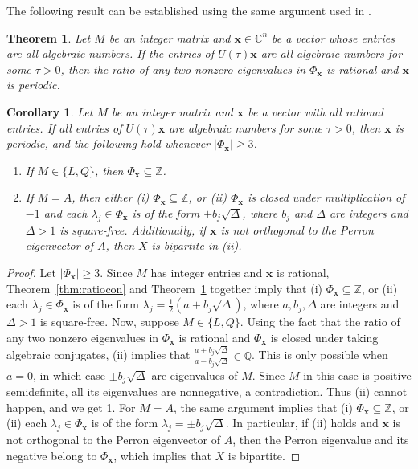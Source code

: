 \documentclass[11pt]{article}
\newtheorem{theorem}{Theorem}
\newtheorem{corollary}{Corollary}
\newcommand{\bx}{\mathbf x}
\newcommand{\supp}{{\Phi}}
\def\C{\mathbb{C}}
\def\Q{\mathbb{Q}}
\def\Z{\mathbb{Z}}
\begin{document}
The following result can be established using the same argument used in 
\cite[Theorem 3.4]{Godsil2013}.

\begin{theorem}
\label{algent}
Let $M$ be an integer matrix and $\bx\in\C^n$ be a vector whose entries are all algebraic numbers. If the entries of $U(\tau)\bx$ are all algebraic numbers for some $\tau>0$, then the ratio of any two nonzero eigenvalues in $\supp_{\bx}$ is rational and $\bx$ is periodic. 
\end{theorem}

\begin{corollary}
\label{cor:lumper}
Let $M$ be an integer matrix and $\bx$ be a vector with all rational entries. If all entries of $U(\tau)\bx$ are algebraic numbers for some $\tau>0$, then $\bx$ is periodic, and 
the following hold whenever $|\supp_{\bx}|\geq 3$.
\begin{enumerate}
\item If $M\in\{L,Q\}$, then $\supp_{\bx}\subseteq\Z$. 
\item If $M=A$, then either (i) $\supp_{\bx}\subseteq\Z$, or (ii) $\supp_{\bx}$ is closed under multiplication of $-1$ and each $\lambda_j\in\supp_{\bx}$ is of the form $\pm b_j\sqrt{\Delta}$, where $b_j$ and $\Delta$ are integers and $\Delta>1$ is square-free. Additionally, if $\bx$ is not orthogonal to the Perron eigenvector of $A$, then $X$ is bipartite in (ii).
\end{enumerate} 
\end{corollary}

\begin{proof}
Let $|\supp_{\bx}|\geq 3$.
Since $M$ has integer entries and $\bx$ is rational, Theorem~\ref{thm:ratiocon} and Theorem~\ref{algent} together imply that (i) $\supp_{\bx}\subseteq\Z$, or (ii) each $\lambda_j\in \supp_{\bx}$ is of the form $\lambda_j=\frac{1}{2}(a+b_j\sqrt{\Delta})$, where $a,b_j,\Delta$ are integers and $\Delta>1$ is square-free. Now, suppose $M\in\{L,Q\}$. Using the fact that the ratio of any two nonzero eigenvalues in $\supp_{\bx}$ is rational and $\supp_{\bx}$ is closed under taking algebraic conjugates, (ii) implies that $\frac{a+b_j\sqrt{\Delta}}{a-b_j\sqrt{\Delta}}\in \Q$. This is only possible when $a=0$, in which case $\pm b_j\sqrt{\Delta}$ are eigenvalues of $M$. Since $M$ in this case is positive semidefinite, all its eigenvalues are nonnegative, a contradiction. Thus (ii) cannot happen, and we get 1. For $M=A$, the same argument implies that (i) $\supp_{\bx}\subseteq\Z$, or (ii) each $\lambda_j\in \supp_{\bx}$ is of the form $\lambda_j=\pm b_j\sqrt{\Delta}$. In particular, if (ii) holds and $\bx$ is not orthogonal to the Perron eigenvector of $A$, then the Perron eigenvalue and its negative belong to $\supp_{\bx}$, which implies that $X$ is bipartite.
\end{proof}
\end{document}
